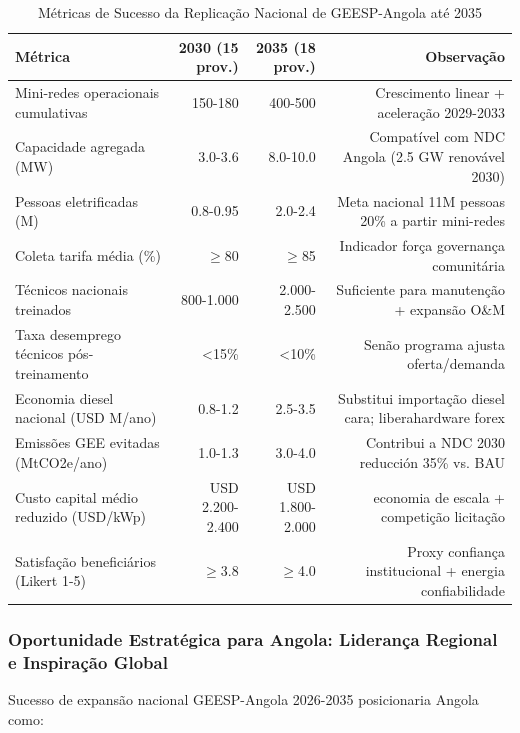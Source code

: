 \documentclass[12pt, a4paper]{article}
\begin{document}
\begin{table}[H]
\centering
\caption{Métricas de Sucesso da Replicação Nacional de GEESP-Angola até 2035}
\label{tab:national_replication_metrics}
\small
\begin{tabular}{|l|r|r|r|}
\hline
\textbf{Métrica} & \textbf{2030 (15 prov.)} & \textbf{2035 (18 prov.)} & \textbf{Observação} \\
\hline
Mini-redes operacionais cumulativas & 150-180 & 400-500 & Crescimento linear + aceleração 2029-2033 \\
\hline
Capacidade agregada (MW) & 3.0-3.6 & 8.0-10.0 & Compatível com NDC Angola (2.5 GW renovável 2030) \\
\hline
Pessoas eletrificadas (M) & 0.8-0.95 & 2.0-2.4 & Meta nacional 11M pessoas ~20\% a partir mini-redes \\
\hline
Coleta tarifa média (\%) & $\geq$80 & $\geq$85 & Indicador força governança comunitária \\
\hline
Técnicos nacionais treinados & 800-1.000 & 2.000-2.500 & Suficiente para manutenção + expansão O\&M \\
\hline
Taxa desemprego técnicos pós-treinamento & <15\% & <10\% & Senão programa ajusta oferta/demanda \\
\hline
Economia diesel nacional (USD M/ano) & 0.8-1.2 & 2.5-3.5 & Substitui importação diesel cara; liberahardware forex \\
\hline
Emissões GEE evitadas (MtCO2e/ano) & 1.0-1.3 & 3.0-4.0 & Contribui a NDC 2030 reducción 35\% vs. BAU \\
\hline
Custo capital médio reduzido (USD/kWp) & USD 2.200-2.400 & USD 1.800-2.000 & economia de escala + competição licitação \\
\hline
Satisfação beneficiários (Likert 1-5) & $\geq$3.8 & $\geq$4.0 & Proxy confiança institucional + energia confiabilidade \\
\hline
\end{tabular}
\end{table}

\subsubsection{Oportunidade Estratégica para Angola: Liderança Regional e Inspiração Global}

Sucesso de expansão nacional GEESP-Angola 2026-2035 posicionaria Angola como:
\end{document}
